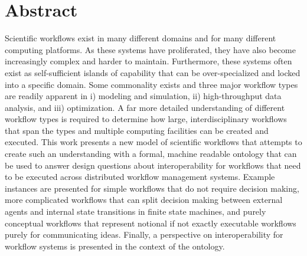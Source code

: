 \chapter*{Abstract}\label{ch:abstract}

Scientific workflows exist in many different domains and for many different
computing platforms. As these systems have proliferated, they have also become
increasingly complex and harder to maintain. Furthermore, these systems often
exist as self-sufficient islands of capability that can be over-specialized and
locked into a specific domain. Some commonality exists and three major workflow
types are readily apparent in i) modeling and simulation, ii) high-throughput
data analysis, and iii) optimization. A far more detailed understanding of
different workflow types is required to determine how large, interdisciplinary
workflows that span the types and multiple computing facilities can be created
and executed. This work presents a new model of scientific workflows that
attempts to create such an understanding with a formal, machine readable
ontology that can be used to answer design questions about interoperability for
workflows that need to be executed across distributed workflow management
systems. Example instances are presented for simple workflows that do not
require decision making, more complicated workflows that can split decision
making between external agents and internal state transitions in finite state
machines, and purely conceptual workflows that represent notional if not exactly
executable workflows purely for communicating ideas. Finally, a perspective on
interoperability for workflow systems is presented in the context of the
ontology.